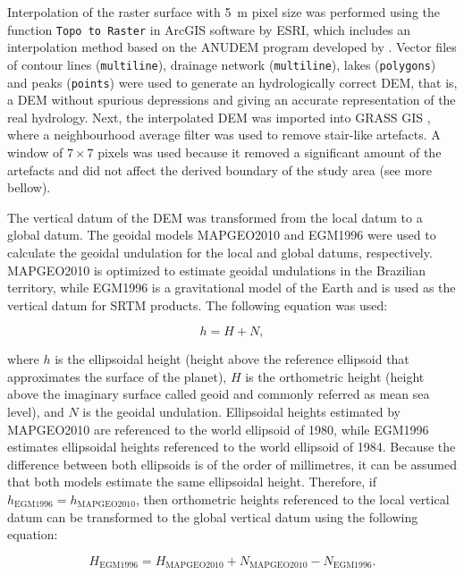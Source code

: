 Interpolation of the raster surface with \SI{5}{\metre} pixel size was performed using the function 
\texttt{Topo to Raster} in ArcGIS\textregistered{} software by ESRI, which includes an interpolation 
method based on the ANUDEM program developed by . Vector files of contour 
lines (\texttt{multiline}), drainage network (\texttt{multiline}), lakes (\texttt{polygons}) and 
peaks (\texttt{points}) were used to generate an hydrologically correct DEM, that is, a DEM without 
spurious depressions and giving an accurate representation of the real hydrology. Next, the 
interpolated DEM was imported into GRASS GIS \cite{GRASS2012}, where a neighbourhood average filter 
was used to remove stair-like artefacts. A window of $7 \times 7$ pixels was used because it 
removed a significant amount of the artefacts and did not affect the derived boundary of the study 
area (see more bellow).

The vertical datum of the DEM was transformed from the local datum to a global datum. The geoidal 
models MAPGEO2010 \cite{IBGE2010a} and EGM1996 \cite{LemoineEtAl1998} were used to calculate the 
geoidal undulation for the local and global datums, respectively. MAPGEO2010 is optimized to 
estimate geoidal undulations in the Brazilian territory, while EGM1996 is a gravitational model of 
the Earth and is used as the vertical datum for SRTM products. The following equation was used:

\begin{equation}
 h = H + N,
\end{equation}

\noindent where $h$ is the ellipsoidal height (height above the reference ellipsoid that 
approximates the surface of the planet), $H$ is the orthometric height (height above the imaginary 
surface called geoid and commonly referred as mean sea level), and $N$ is the geoidal undulation. 
Ellipsoidal heights estimated by MAPGEO2010 are referenced to the world ellipsoid of 1980, while 
EGM1996 estimates ellipsoidal heights referenced to the world ellipsoid of 1984. Because the 
difference between both ellipsoids is of the order of millimetres, it can be assumed that both 
models estimate the same ellipsoidal height. Therefore, if 
$h_{\text{EGM1996}} = h_{\text{MAPGEO2010}}$, then orthometric heights referenced to the local 
vertical datum can be transformed to the global vertical datum using the following equation:

\begin{equation}\label{eq:geoidal}
 H_{\text{EGM1996}} = H_{\text{MAPGEO2010}} + N_{\text{MAPGEO2010}} - N_{\text{EGM1996}}.
\end{equation}

